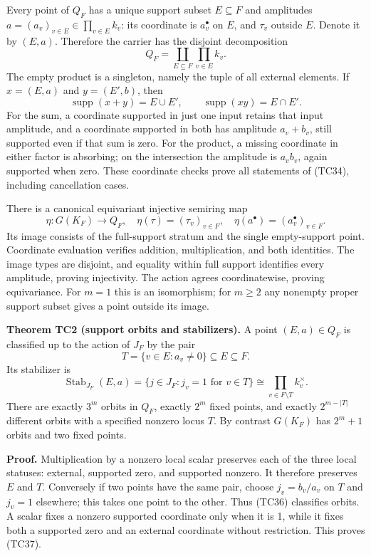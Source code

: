 \documentclass[
  10pt,
]{article}
\begin{document}
Every point of \(Q_F\) has a unique support subset \(E\subseteq F\) and
amplitudes \(a=(a_v)_{v\in E}\in\prod_{v\in E}k_v\): its coordinate is
\(a_v^\bullet\) on \(E\), and \(\tau_v\) outside \(E\). Denote it by
\((E,a)\). Therefore the carrier has the disjoint decomposition \[
Q_F=\coprod_{E\subseteq F}\prod_{v\in E}k_v.
\tag{TC33}
\] The empty product is a singleton, namely the tuple of all external
elements. If \(x=(E,a)\) and \(y=(E',b)\), then \[
\operatorname{supp}(x+y)=E\cup E',\qquad
\operatorname{supp}(xy)=E\cap E'.
\tag{TC34}
\] For the sum, a coordinate supported in just one input retains that
input amplitude, and a coordinate supported in both has amplitude
\(a_v+b_v\), still supported even if that sum is zero. For the product,
a missing coordinate in either factor is absorbing; on the intersection
the amplitude is \(a_vb_v\), again supported when zero. These coordinate
checks prove all statements of (TC34), including cancellation cases.

There is a canonical equivariant injective semiring map \[
\eta:G(K_F)\longrightarrow Q_F,
\quad\eta(\tau)=(\tau_v)_{v\in F},\quad
\eta(a^\bullet)=(a_v^\bullet)_{v\in F}.
\tag{TC35}
\] Its image consists of the full-support stratum and the single
empty-support point. Coordinate evaluation verifies addition,
multiplication, and both identities. The image types are disjoint, and
equality within full support identifies every amplitude, proving
injectivity. The action agrees coordinatewise, proving equivariance. For
\(m=1\) this is an isomorphism; for \(m\ge2\) any nonempty proper
support subset gives a point outside its image.

\textbf{Theorem TC2 (support orbits and stabilizers).} A point
\((E,a)\in Q_F\) is classified up to the action of \(J_F\) by the pair
\[
T=\{v\in E:a_v\ne0\}\subseteq E\subseteq F.
\tag{TC36}
\] Its stabilizer is \[
\operatorname{Stab}_{J_F}(E,a)
=\{j\in J_F:j_v=1\text{ for }v\in T\}
\cong\prod_{v\in F\setminus T}k_v^\times.
\tag{TC37}
\] There are exactly \(3^m\) orbits in \(Q_F\), exactly \(2^m\) fixed
points, and exactly \(2^{m-|T|}\) different orbits with a specified
nonzero locus \(T\). By contrast \(G(K_F)\) has \(2^m+1\) orbits and two
fixed points.

\textbf{Proof.} Multiplication by a nonzero local scalar preserves each
of the three local statuses: external, supported zero, and supported
nonzero. It therefore preserves \(E\) and \(T\). Conversely if two
points have the same pair, choose \(j_v=b_v/a_v\) on \(T\) and \(j_v=1\)
elsewhere; this takes one point to the other. Thus (TC36) classifies
orbits. A scalar fixes a nonzero supported coordinate only when it is 1,
while it fixes both a supported zero and an external coordinate without
restriction. This proves (TC37).
\end{document}
